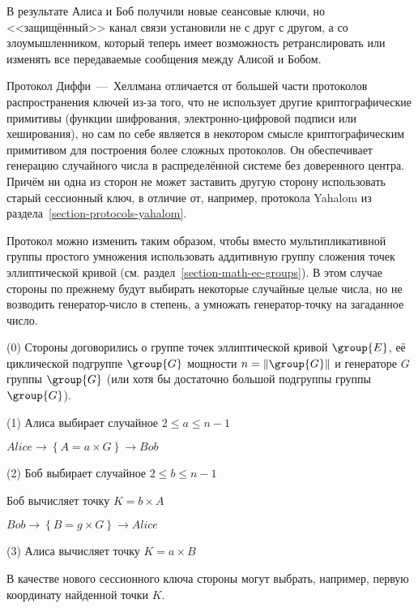 В результате Алиса и Боб получили новые сеансовые ключи, но <<защищённый>> канал связи установили не с друг с другом, а со злоумышленником, который теперь имеет возможность ретранслировать или изменять все передаваемые сообщения между Алисой и Бобом.

Протокол Диффи~---~Хеллмана отличается от большей части протоколов распространения ключей из-за того, что не использует другие криптографические примитивы (функции шифрования, электронно-цифровой подписи или хеширования), но сам по себе является в некотором смысле криптографическим примитивом для построения более сложных протоколов. Он обеспечивает генерацию случайного числа в распределённой системе без доверенного центра. Причём ни одна из сторон не может заставить другую сторону использовать старый сессионный ключ, в отличие от, например, протокола Yahalom из раздела~\ref{section-protocols-yahalom}.

Протокол можно изменить таким образом, чтобы вместо мультипликативной группы простого умножения использовать аддитивную группу сложения точек эллиптической кривой (см. раздел~\ref{section-math-ec-groups}). В этом случае стороны по прежнему будут выбирать некоторые случайные целые числа, но не возводить генератор-число в степень, а умножать генератор-точку на загаданное число.

\begin{protocol}
    \item[(0)] Стороны договорились о группе точек эллиптической кривой $\group{E}$, её циклической подгруппе $\group{G}$ мощности $n = \| \group{G} \|$ и генераторе $G$ группы $\group{G}$ (или хотя бы достаточно большой подгруппы группы $\group{G}$).
    \item[(1)] Алиса выбирает случайное $2 \leq a \leq n - 1$
    \item[{}] $Alice \to \left\{ A = a \times G \right\} \to Bob$
    \item[(2)] Боб выбирает случайное $2 \leq b \leq n - 1$
    \item[{}] Боб вычисляет точку $K = b \times A$
    \item[{}] $Bob \to \left\{ B = g \times G \right\} \to Alice$
    \item[(3)] Алиса вычисляет точку $K = a \times B$
\end{protocol}

В качестве нового сессионного ключа стороны могут выбрать, например, первую координату найденной точки $K$.

